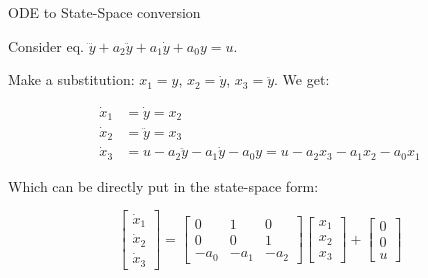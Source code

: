 \documentclass{beamer}
\begin{document}
\begin{frame}{ODE to State-Space conversion}
\begin{flushleft}

Consider eq. $\dddot{y} + a_2 \ddot{y} + a_1 \dot{y} + a_0 y =u$.

\bigskip

Make a substitution: $x_1 = y$, $x_2 = \dot{y}$, $x_3 = \ddot{y}$. We get:

\begin{align}
        \dot{x}_1 &= \dot{y} = x_2 \\
        \dot{x}_2 &= \ddot{y} = x_3 \\
        \dot{x}_3 &=  u-a_2 \ddot{y} - a_1 \dot{y} - a_0 y = 
        u-a_2 x_3 - a_1 x_2 - a_0 x_1
\end{align}

Which can be directly put in the state-space form:

\begin{equation}
\begin{bmatrix}
\dot{x}_1 \\ \dot{x}_2 \\ \dot{x}_3
\end{bmatrix} 
=
\begin{bmatrix}
0 & 1 & 0 \\ 
0 & 0 & 1 \\
-a_0 & -a_1 & -a_2
\end{bmatrix} 
\begin{bmatrix}
x_1 \\ x_2 \\ x_3
\end{bmatrix} 
+ 
\begin{bmatrix}
0 \\ 0 \\ u
\end{bmatrix}
\end{equation}


\end{flushleft}
\end{frame}
\end{document}
